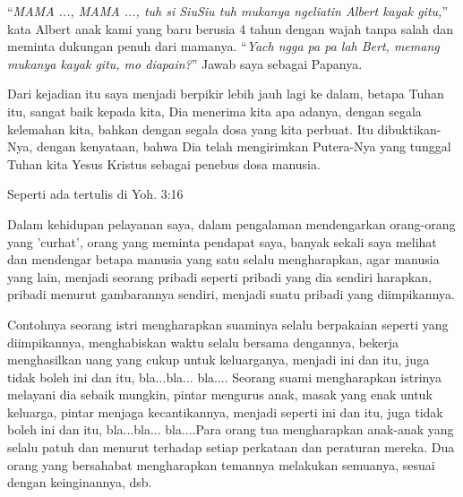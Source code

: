  
``\textit{MAMA ..., MAMA ..., tuh si SiuSiu tuh mukanya ngeliatin Albert kayak gitu,}'' kata Albert anak kami yang baru berusia 4 tahun dengan wajah tanpa salah dan meminta dukungan penuh dari mamanya. ``\textit{Yach ngga pa pa lah Bert, memang mukanya kayak gitu, mo diapain?}'' Jawab saya sebagai Papanya. 

Dari kejadian itu saya menjadi berpikir lebih jauh lagi ke dalam, betapa Tuhan itu, sangat baik kepada kita, Dia menerima kita apa adanya, dengan segala kelemahan kita, bahkan dengan segala dosa yang kita perbuat.
Itu dibuktikan-Nya, dengan kenyataan, bahwa Dia telah mengirimkan Putera-Nya yang tunggal Tuhan kita Yesus Kristus sebagai penebus dosa manusia. 

Seperti ada tertulis di Yoh. 3:16 

Dalam kehidupan pelayanan saya, dalam pengalaman mendengarkan orang-orang yang 'curhat', orang yang meminta pendapat saya, banyak sekali saya melihat dan mendengar betapa manusia yang satu selalu mengharapkan, agar manusia yang lain, menjadi seorang pribadi seperti pribadi yang dia sendiri harapkan, pribadi menurut gambarannya sendiri, menjadi suatu pribadi yang diimpikannya.

Contohnya seorang istri mengharapkan suaminya selalu berpakaian seperti yang diimpikannya, menghabiskan waktu selalu bersama dengannya, bekerja menghasilkan uang yang cukup untuk keluarganya, menjadi ini dan itu, juga tidak boleh ini dan itu, bla...bla... bla.... Seorang suami mengharapkan istrinya melayani dia sebaik mungkin, pintar mengurus anak, masak yang enak untuk keluarga, pintar menjaga kecantikannya, menjadi seperti ini dan itu, juga tidak boleh ini dan itu, bla...bla... bla....Para orang tua mengharapkan anak-anak yang selalu patuh dan menurut terhadap setiap perkataan dan peraturan mereka. Dua orang yang bersahabat mengharapkan temannya melakukan semuanya, sesuai dengan keinginannya, dsb.

